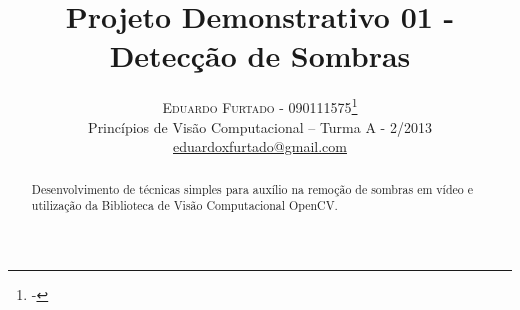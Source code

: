 \documentclass[twoside]{article}
\title{\vspace{-15mm}\fontsize{24pt}{10pt}\selectfont\textbf{Projeto Demonstrativo 01 - Detecção de Sombras}} %
\author{
\large
\textsc{Eduardo Furtado - 090111575}\thanks{-}\\[2mm] %
\normalsize Princípios de Visão Computacional – Turma A - 2/2013 \\ %
\normalsize \href{mailto:eduardoxfurtado@gmail.com}{eduardoxfurtado@gmail.com} %
\vspace{-5mm}
}
\date{}
\begin{document}
\maketitle %

\thispagestyle{fancy} %


\begin{abstract}

\noindent %
Desenvolvimento de técnicas simples para auxílio na remoção de sombras em vídeo e utilização da Biblioteca de Visão Computacional OpenCV.


\end{abstract}

\end{document}
